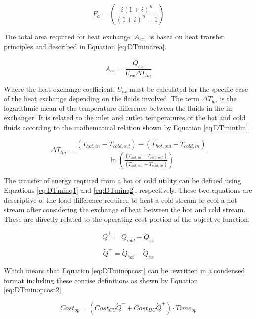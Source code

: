 \begin{equation}\label{eq:DTminamort}
F_a=\left(\frac{i(1+i)^n}{(1+i)^n-1}\right)
\end{equation}

The total area required for heat exchange, $A_{ex}$, is based on heat transfer principles and described in Equation \ref{eq:DTminarea}.

\begin{equation}\label{eq:DTminarea}
A_{ex}=\frac{\dot Q_{ex}}{U_{ex}\Delta T_{lm}}
\end{equation}

Where the heat exchange coefficient, $U_{ex}$ must be calculated for the specific case of the heat exchange depending on the fluids involved. The term $\Delta T_{lm}$ is the logarithmic mean of the temperature difference between the fluids in the in exchanger. It is related to the inlet and outlet temperatures of the hot and cold fluids according to the mathematical relation shown by Equation \ref{eq:DTmintlm}.

\begin{equation}\label{eq:DTmintlm}
\Delta T_{lm}= \frac{(T_{hot,in}-T_{cold,out})-(T_{hot,out}-T_{cold,in})}{\ln\left(\frac{(T_{hot,in}-T_{cold,out})}{(T_{hot,out}-T_{cold,in})}\right)}
\end{equation}

The transfer of energy required from a hot or cold utility can be defined using Equations \ref{eq:DTminq1} and \ref{eq:DTminq2}, respectively. These two equations are descriptive of the load difference required to heat a cold stream or cool a hot stream after considering the exchange of heat between the hot and cold stream. These are directly related to the operating cost portion of the objective function.

\begin{equation}\label{eq:DTminq1}
\dot Q^+=\dot Q_{cold}-\dot Q_{ex}
\end{equation}

\begin{equation}\label{eq:DTminq2}
\dot Q^-=\dot Q_{hot}-\dot Q_{ex}
\end{equation}

Which means that Equation \ref{eq:DTminopcost} can be rewritten in a condensed format including these concise definitions as shown by Equation \ref{eq:DTminopcost2}

\begin{equation}\label{eq:DTminopcost2}
Cost_{op}=\left(Cost_{CU} \dot Q^-+ Cost_{HU} \dot Q^+\right) \cdot Time_{op}
\end{equation}

